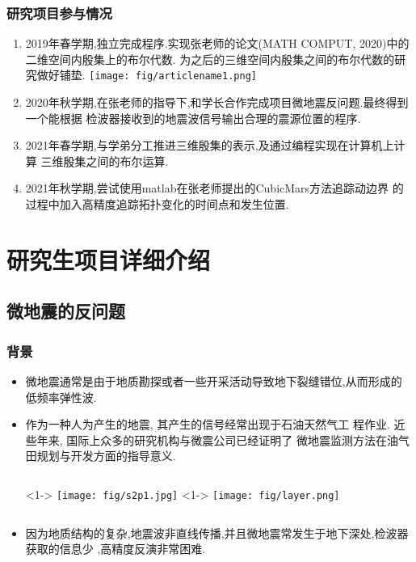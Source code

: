 \documentclass[UTF8]{ctexbeamer}	%
\theoremstyle{plain}
\theoremstyle{definition}
\theoremstyle{remark}
\numberwithin{equation}{section}
\begin{document}
\begin{frame}[fragile]
   \frametitle{研究项目参与情况}
    \small{\begin{enumerate}
        \item 2019年春学期,独立完成程序.实现张老师的论文(MATH COMPUT, 2020)中的二维空间内殷集上的布尔代数.
        为之后的三维空间内殷集之间的布尔代数的研究做好铺垫.
        \texttt{[image: fig/articlename1.png]}
        \item 2020年秋学期,在张老师的指导下,和学长合作完成项目微地震反问题.最终得到一个能根据
        检波器接收到的地震波信号输出合理的震源位置的程序.
        \item 2021年春学期,与学弟分工推进三维殷集的表示,及通过编程实现在计算机上计算
        三维殷集之间的布尔运算.
        \item 2021年秋学期,尝试使用matlab在张老师提出的CubicMars方法追踪动边界
        的过程中加入高精度追踪拓扑变化的时间点和发生位置.
    \end{enumerate}}
\end{frame}

\section{研究生项目详细介绍}
\subsection{微地震的反问题}

\begin{frame}[fragile]
    \frametitle{背景}
    \begin{itemize}
        \item  微地震通常是由于地质勘探或者一些开采活动导致地下裂缝错位,从而形成的
        低频率弹性波.
        \item 作为一种人为产生的地震, 其产生的信号经常出现于石油天然气工
        程作业. 近些年来, 国际上众多的研究机构与微震公司已经证明了
        微地震监测方法在油气田规划与开发方面的指导意义.
        \begin{columns}
            <1->
                \texttt{[image: fig/s2p1.jpg]}
            <1->
            \texttt{[image: fig/layer.png]}
        \end{columns}
        \item 因为地质结构的复杂,地震波非直线传播,并且微地震常发生于地下深处,检波器获取的信息少
        ,高精度反演非常困难. 
    \end{itemize}
\end{frame}
\end{document}
